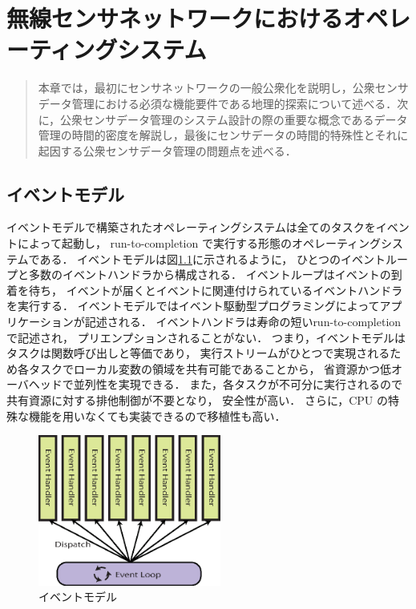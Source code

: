 \chapter{無線センサネットワークにおけるオペレーティングシステム}
\begin{large}
\begin{quote}
本章では，最初にセンサネットワークの一般公衆化を説明し，公衆センサデータ管理における必須な機能要件である地理的探索について述べる．次に，公衆センサデータ管理のシステム設計の際の重要な概念であるデータ管理の時間的密度を解説し，最後にセンサデータの時間的特殊性とそれに起因する公衆センサデータ管理の問題点を述べる．
\end{quote}
\end{large}
\clearpage



\section{イベントモデル}
イベントモデルで構築されたオペレーティングシステムは全てのタスクをイベントによって起動し，
run-to-completion で実行する形態のオペレーティングシステムである．
イベントモデルは図\ref{fig:event_model}に示されるように，
ひとつのイベントループと多数のイベントハンドラから構成される．
イベントループはイベントの到着を待ち，
イベントが届くとイベントに関連付けられているイベントハンドラを実行する．
イベントモデルではイベント駆動型プログラミングによってアプリケーションが記述される．
イベントハンドラは寿命の短いrun-to-completionで記述され，
プリエンプションされることがない．
つまり，イベントモデルはタスクは関数呼び出しと等価であり，
実行ストリームがひとつで実現されるため各タスクでローカル変数の領域を共有可能であることから，
省資源かつ低オーバヘッドで並列性を実現できる．
また，各タスクが不可分に実行されるので共有資源に対する排他制御が不要となり，
安全性が高い．
さらに，CPU の特殊な機能を用いなくても実装できるので移植性も高い．
\begin{figure}[htbp]
 \begin{center}
  \includegraphics[width=60mm]{./images/event_model.eps}
 \end{center}
 \caption{イベントモデル}
 \label{fig:event_model}
\end{figure}


